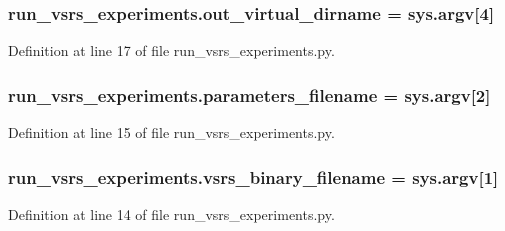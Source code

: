 \subsubsection[{\texorpdfstring{out\+\_\+virtual\+\_\+dirname}{out_virtual_dirname}}]{\setlength{\rightskip}{0pt plus 5cm}run\+\_\+vsrs\+\_\+experiments.\+out\+\_\+virtual\+\_\+dirname = sys.\+argv\mbox{[}4\mbox{]}}\hypertarget{namespacerun__vsrs__experiments_ae05c0e64146770296e94c641b040b5c6}{}\label{namespacerun__vsrs__experiments_ae05c0e64146770296e94c641b040b5c6}


Definition at line 17 of file run\+\_\+vsrs\+\_\+experiments.\+py.

\subsubsection[{\texorpdfstring{parameters\+\_\+filename}{parameters_filename}}]{\setlength{\rightskip}{0pt plus 5cm}run\+\_\+vsrs\+\_\+experiments.\+parameters\+\_\+filename = sys.\+argv\mbox{[}2\mbox{]}}\hypertarget{namespacerun__vsrs__experiments_ab796f5c8f678b861ed3f34beb71e181b}{}\label{namespacerun__vsrs__experiments_ab796f5c8f678b861ed3f34beb71e181b}


Definition at line 15 of file run\+\_\+vsrs\+\_\+experiments.\+py.

\subsubsection[{\texorpdfstring{vsrs\+\_\+binary\+\_\+filename}{vsrs_binary_filename}}]{\setlength{\rightskip}{0pt plus 5cm}run\+\_\+vsrs\+\_\+experiments.\+vsrs\+\_\+binary\+\_\+filename = sys.\+argv\mbox{[}1\mbox{]}}\hypertarget{namespacerun__vsrs__experiments_a2ccbb110feafbaec437f5ff9aad76bc5}{}\label{namespacerun__vsrs__experiments_a2ccbb110feafbaec437f5ff9aad76bc5}


Definition at line 14 of file run\+\_\+vsrs\+\_\+experiments.\+py.

